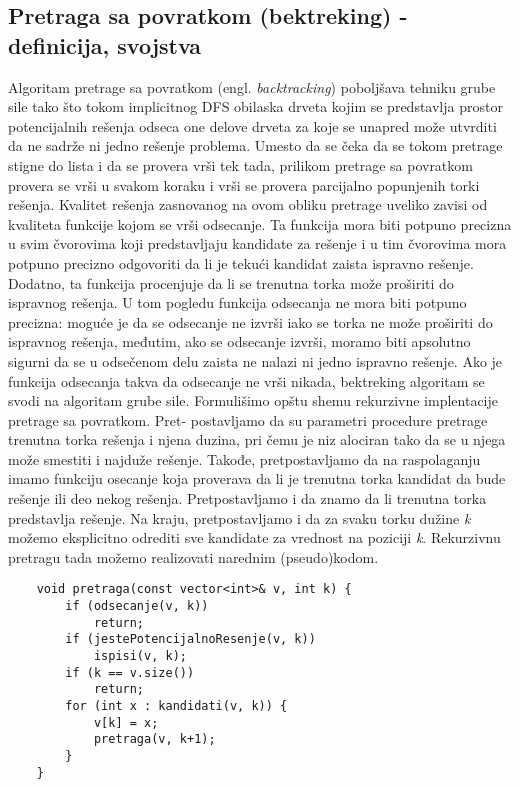 \documentclass{article}
\begin{document}
\subsection{Pretraga sa povratkom (bektreking) - definicija, svojstva}
Algoritam pretrage sa povratkom (engl. \textit{backtracking}) poboljšava tehniku grube
sile tako što tokom implicitnog DFS obilaska drveta kojim se predstavlja prostor
potencijalnih rešenja odseca one delove drveta za koje se unapred može utvrditi
da ne sadrže ni jedno rešenje problema. Umesto da se čeka da se tokom
pretrage stigne do lista i da se provera vrši tek tada, prilikom pretrage sa
povratkom provera se vrši u svakom koraku i vrši se provera parcijalno popunjenih
torki rešenja. Kvalitet rešenja zasnovanog na ovom obliku pretrage uveliko zavisi
od kvaliteta funkcije kojom se vrši odsecanje. Ta funkcija mora biti potpuno
precizna u svim čvorovima koji predstavljaju kandidate za rešenje i u tim
čvorovima mora potpuno precizno odgovoriti da li je tekući kandidat zaista
ispravno rešenje. Dodatno, ta funkcija procenjuje da li se trenutna torka može
proširiti do ispravnog rešenja. U tom pogledu funkcija odsecanja ne mora biti
potpuno precizna: moguće je da se odsecanje ne izvrši iako se torka ne može
proširiti do ispravnog rešenja, međutim, ako se odsecanje izvrši, moramo biti
apsolutno sigurni da se u odsečenom delu zaista ne nalazi ni jedno ispravno rešenje. Ako je funkcija odsecanja takva da odsecanje ne vrši nikada, bektreking
algoritam se svodi na algoritam grube sile.\newline
Formulišimo opštu shemu rekurzivne implentacije pretrage sa povratkom. Pret-
postavljamo da su parametri procedure pretrage trenutna torka rešenja i njena
duzina, pri čemu je niz alociran tako da se u njega može smestiti i najduže
rešenje. Takođe, pretpostavljamo da na raspolaganju imamo funkciju osecanje
koja proverava da li je trenutna torka kandidat da bude rešenje ili deo nekog
rešenja. Pretpostavljamo i da znamo da li trenutna torka predstavlja rešenje. Na kraju, pretpostavljamo i da za svaku torku dužine \textit{k} možemo
eksplicitno odrediti sve kandidate za vrednost na poziciji \textit{k}. Rekurzivnu pretragu
tada možemo realizovati narednim (pseudo)kodom.
\begin{lstlisting}
    void pretraga(const vector<int>& v, int k) {
        if (odsecanje(v, k))
            return;
        if (jestePotencijalnoResenje(v, k))
            ispisi(v, k);
        if (k == v.size())
            return;
        for (int x : kandidati(v, k)) {
            v[k] = x;
            pretraga(v, k+1);
        }
    }
\end{lstlisting}
\end{document}
